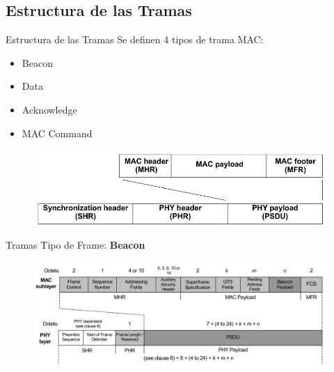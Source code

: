 \documentclass[aspectratio=169]{beamer}
\begin{document}
\subsection[Tramas]{Estructura de las Tramas}

\begin{frame}{Estructura de las Tramas}
Se definen 4 tipos de trama MAC:
\vspace{5px}
	\begin{itemize}
		\item Beacon
		\vspace{5px}
		\item Data
		\vspace{5px}
		\item Acknowledge
		\vspace{5px}
		\item MAC Command
		\vspace{5px}
	\end{itemize}
	\begin{figure}[H]
		\includegraphics[width=1\textwidth]{./imagenes/frameStructure}
	\end{figure}	 	
\end{frame}

\begin{frame}[t]{Tramas}
Tipo de Frame: \textbf{Beacon}
\vspace{10px}
	\begin{figure}[H]
		\includegraphics[width=1\textwidth]{./imagenes/beacon.jpg}
	\end{figure}	  	  	
\end{frame}
\end{document}
